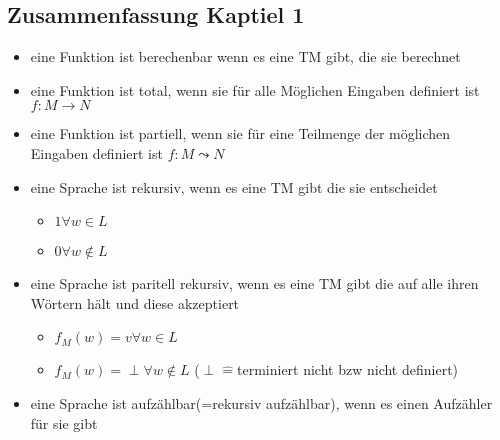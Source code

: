 \documentclass[a4paper, 10pt]{article}
\theoremstyle{definition}
\begin{document}
\subsection{Zusammenfassung Kaptiel 1}
\begin{itemize}
\item eine Funktion ist berechenbar wenn es eine TM gibt, die sie berechnet
\item eine Funktion ist total, wenn sie für alle Möglichen Eingaben definiert ist $f:M\to N$
\item eine Funktion ist partiell, wenn sie für eine Teilmenge der möglichen Eingaben definiert ist $f:M\leadsto N$
\item eine Sprache ist rekursiv, wenn es eine TM gibt die sie entscheidet\begin{itemize}
\item $1\forall w \in L$
\item $0\forall w\not\in L$
\end{itemize}
\item eine Sprache ist paritell rekursiv, wenn es eine TM gibt die auf alle ihren Wörtern hält und diese akzeptiert\begin{itemize}
\item $f_M(w)=v\forall w\in L$
\item $f_M(w)=\perp\forall w\not\in L$ ($\perp\widehat{=}$terminiert nicht bzw nicht definiert)
\end{itemize}
\item eine Sprache ist aufzählbar(=rekursiv aufzählbar), wenn es einen Aufzähler für sie gibt
\end{itemize}
\end{document}
